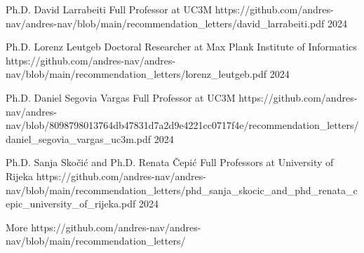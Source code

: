 

\begin{cvhonors}

	\cvhonor%
	{Ph.D. David Larrabeiti} %
	{Full Professor at UC3M} %
	{https://github.com/andres-nav/andres-nav/blob/main/recommendation_letters/david_larrabeiti.pdf} %
	{2024} %

	\cvhonor%
	{Ph.D. Lorenz Leutgeb} %
	{Doctoral Researcher at Max Plank Institute of Informatics} %
	{https://github.com/andres-nav/andres-nav/blob/main/recommendation_letters/lorenz_leutgeb.pdf} %
	{2024} %

	\cvhonor%
	{Ph.D. Daniel Segovia Vargas} %
	{Full Professor at UC3M} %
	{https://github.com/andres-nav/andres-nav/blob/8098798013764db47831d7a2d9e4221cc0717f4e/recommendation_letters/daniel_segovia_vargas_uc3m.pdf} %
	{2024} %

	\cvhonor%
	{Ph.D. Sanja Skočić and Ph.D. Renata Čepić} %
	{Full Professors at University of Rijeka} %
	{https://github.com/andres-nav/andres-nav/blob/main/recommendation_letters/phd_sanja_skocic_and_phd_renata_cepic_university_of_rijeka.pdf} %
	{2024} %

	\cvhonor%
	{More} %
	{} %
	{https://github.com/andres-nav/andres-nav/blob/main/recommendation_letters/} %
	{} %

\end{cvhonors}
